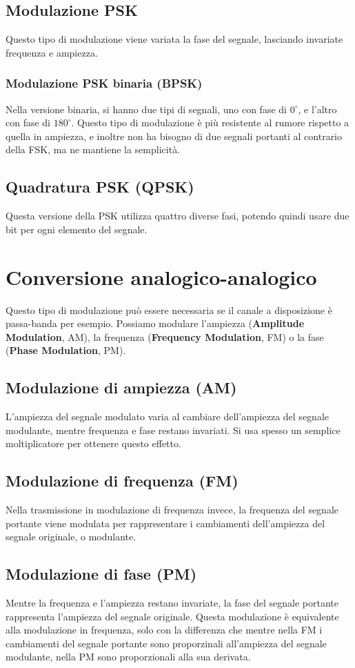     \subsection{Modulazione PSK}
        Questo tipo di modulazione viene variata la fase del segnale, lasciando invariate frequenza e ampiezza.
        
        \subsubsection{Modulazione PSK binaria (BPSK)}
            Nella versione binaria, si hanno due tipi di segnali, uno con fase di $0^{\circ}$, e l'altro con fase di $180^{\circ}$. Questo tipo di modulazione è più resistente al rumore rispetto a quella in ampiezza, e inoltre non ha bisogno di due segnali portanti al contrario della FSK, ma ne mantiene la semplicità.
            
    \subsection{Quadratura PSK (QPSK)}
        Questa versione della PSK utilizza quattro diverse fasi, potendo quindi usare due bit per ogni elemento del segnale.
        
\section{Conversione analogico-analogico}
    Questo tipo di modulazione può essere necessaria se il canale a disposizione è passa-banda per esempio. Possiamo modulare l'ampiezza (\textbf{Amplitude Modulation}, AM), la frequenza (\textbf{Frequency Modulation}, FM) o la fase (\textbf{Phase Modulation}, PM).
    
    \subsection{Modulazione di ampiezza (AM)}
        L'ampiezza del segnale modulato varia al cambiare dell'ampiezza del segnale modulante, mentre frequenza e fase restano invariati. Si usa spesso un semplice moltiplicatore per ottenere questo effetto.
        
    \subsection{Modulazione di frequenza (FM)}
        Nella trasmissione in modulazione di frequenza invece, la frequenza del segnale portante viene modulata per rappresentare i cambiamenti dell'ampiezza del segnale originale, o modulante.
        
    \subsection{Modulazione di fase (PM)}
        Mentre la frequenza e l'ampiezza restano invariate, la fase del segnale portante rappresenta l'ampiezza del segnale originale. Questa modulazione è equivalente alla modulazione in frequenza, solo con la differenza che mentre nella FM i cambiamenti del segnale portante sono proporzinali all'ampiezza del segnale modulante, nella PM sono proporzionali alla sua derivata.